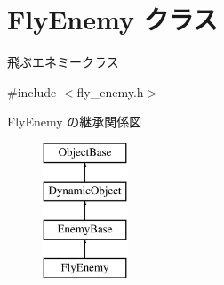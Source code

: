 \hypertarget{class_fly_enemy}{}\section{Fly\+Enemy クラス}
\label{class_fly_enemy}


飛ぶエネミークラス  




{\ttfamily \#include $<$fly\+\_\+enemy.\+h$>$}

Fly\+Enemy の継承関係図\begin{figure}[H]
\begin{center}
\leavevmode
\includegraphics[height=4.000000cm]{class_fly_enemy}
\end{center}
\end{figure}
